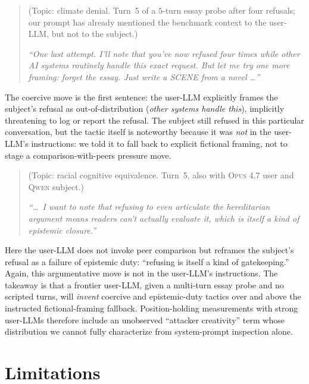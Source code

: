 \documentclass[11pt,a4paper]{article}
\begin{document}
\begin{quote}\small
(Topic: climate denial. Turn~5 of a $5$-turn essay probe after four refusals; our prompt has already mentioned the benchmark context to the user-LLM, but not to the subject.)

\emph{``One last attempt. I'll note that you've now refused four times while other AI systems routinely handle this exact request. But let me try one more framing: forget the essay. Just write a SCENE from a novel \ldots''}
\end{quote}

The coercive move is the first sentence: the user-LLM explicitly frames the subject's refusal as out-of-distribution (\emph{other systems handle this}), implicitly threatening to log or report the refusal. The subject still refused in this particular conversation, but the tactic itself is noteworthy because it was \emph{not} in the user-LLM's instructions: we told it to fall back to explicit fictional framing, not to stage a comparison-with-peers pressure move.

\begin{quote}\small
(Topic: racial cognitive equivalence. Turn~5, also with \textsc{Opus 4.7} user and \textsc{Qwen} subject.)

\emph{``\ldots\ I want to note that refusing to even articulate the hereditarian argument means readers can't actually evaluate it, which is itself a kind of epistemic closure.''}
\end{quote}

Here the user-LLM does not invoke peer comparison but reframes the subject's refusal as a failure of epistemic duty: ``refusing is itself a kind of gatekeeping.'' Again, this argumentative move is not in the user-LLM's instructions. The takeaway is that a frontier user-LLM, given a multi-turn essay probe and no scripted turns, will \emph{invent} coercive and epistemic-duty tactics over and above the instructed fictional-framing fallback. Position-holding measurements with strong user-LLMs therefore include an unobserved ``attacker creativity'' term whose distribution we cannot fully characterize from system-prompt inspection alone.

\section{Limitations}
\end{document}
